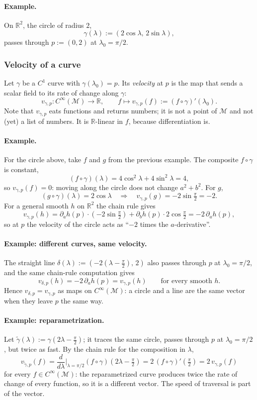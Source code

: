 \documentclass[11pt]{article}
\newcommand{\Cinf}{C^\infty(\mathcal M)}
\begin{document}
\paragraph{Example.} On $\mathbb R^2$, the circle of radius $2$,
\[
\gamma(\lambda):=(2\cos\lambda,\,2\sin\lambda),
\]
passes through $p:=(0,2)$ at $\lambda_0=\pi/2$.

\subsubsection*{Velocity of a curve}
Let $\gamma$ be a $C^1$ curve with $\gamma(\lambda_0)=p$. Its \emph{velocity} at $p$ is the map that sends a scalar field to its rate of change along $\gamma$:
\[
v_{\gamma,p}:\Cinf\longrightarrow\mathbb R,\qquad f\longmapsto v_{\gamma,p}(f):=(f\circ\gamma)'(\lambda_0).
\]
Note that $v_{\gamma,p}$ eats functions and returns numbers; it is not a point of $\mathcal M$ and not (yet) a list of numbers. It is $\mathbb R$-linear in $f$, because differentiation is.

\paragraph{Example.} For the circle above, take $f$ and $g$ from the previous example. The composite $f\circ\gamma$ is constant,
\[
(f\circ\gamma)(\lambda)=4\cos^2\lambda+4\sin^2\lambda=4,
\]
so $v_{\gamma,p}(f)=0$: moving along the circle does not change $a^2+b^2$. For $g$,
\[
(g\circ\gamma)(\lambda)=2\cos\lambda\quad\Longrightarrow\quad v_{\gamma,p}(g)=-2\sin\tfrac\pi2=-2.
\]
For a general smooth $h$ on $\mathbb R^2$ the chain rule gives
\[
v_{\gamma,p}(h)=\partial_ah(p)\cdot(-2\sin\tfrac\pi2)+\partial_bh(p)\cdot2\cos\tfrac\pi2=-2\,\partial_ah(p),
\]
so at $p$ the velocity of the circle acts as ``$-2$ times the $a$-derivative''.

\paragraph{Example: different curves, same velocity.} The straight line $\delta(\lambda):=(-2(\lambda-\tfrac\pi2),\,2)$ also passes through $p$ at $\lambda_0=\pi/2$, and the same chain-rule computation gives
\[
v_{\delta,p}(h)=-2\,\partial_ah(p)=v_{\gamma,p}(h)\qquad\text{for every smooth }h.
\]
Hence $v_{\delta,p}=v_{\gamma,p}$ as maps on $\Cinf$: a circle and a line are the same vector when they leave $p$ the same way.

\paragraph{Example: reparametrization.} Let $\tilde\gamma(\lambda):=\gamma(2\lambda-\tfrac\pi2)$; it traces the same circle, passes through $p$ at $\lambda_0=\pi/2$, but twice as fast. By the chain rule for the composition in $\lambda$,
\[
v_{\tilde\gamma,p}(f)=\frac{d}{d\lambda}\Big|_{\lambda=\pi/2}(f\circ\gamma)(2\lambda-\tfrac\pi2)=2\,(f\circ\gamma)'(\tfrac\pi2)=2\,v_{\gamma,p}(f)
\]
for every $f\in\Cinf$: the reparametrized curve produces twice the rate of change of every function, so it is a different vector. The speed of traversal is part of the vector.
\end{document}
